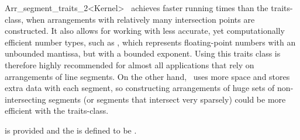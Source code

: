 \begin{ccRefClass}{Arr_segment_traits_2<Kernel>}
\ccRefName\ achieves faster running times than the
 traits-class, when
arrangements with relatively many intersection points are constructed.
It also allows for working with less accurate, yet computationally
efficient number types, such as , which
represents floating-point numbers with an unbounded mantissa, but with
a bounded exponent. Using this traits class is therefore highly recommended
for almost all applications that rely on arrangements of line segments.
On the other hand, \ccRefName\  uses more space and stores extra data with
each segment, so constructing arrangements of huge sets of non-intersecting
segments (or segments that intersect very sparsely) could be more efficient
with the  traits-class.

 is provided and the 
is defined to be .


 
\ccIsModel
     \\

\end{ccRefClass}

\ccRefPageEnd
